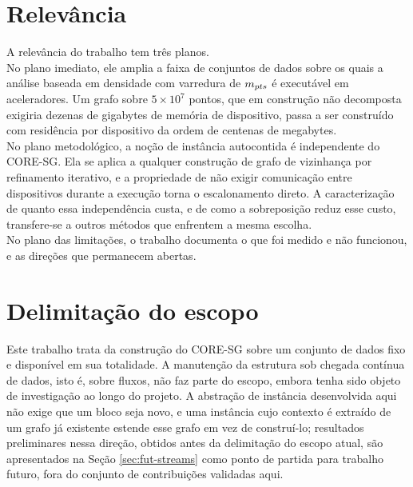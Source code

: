 \section{Relevância\label{sec:significance}}

A relevância do trabalho tem três planos.\\

No plano imediato, ele amplia a faixa de conjuntos de dados sobre os quais a análise baseada em densidade com varredura de $m_{pts}$ é executável em aceleradores. Um grafo sobre $5 \times 10^7$ pontos, que em construção não decomposta exigiria dezenas de gigabytes de memória de dispositivo, passa a ser construído com residência por dispositivo da ordem de centenas de megabytes.\\

No plano metodológico, a noção de instância autocontida é independente do \ac{CORE-SG}. Ela se aplica a qualquer construção de grafo de vizinhança por refinamento iterativo, e a propriedade de não exigir comunicação entre dispositivos durante a execução torna o escalonamento direto. A caracterização de quanto essa independência custa, e de como a sobreposição reduz esse custo, transfere-se a outros métodos que enfrentem a mesma escolha.\\

No plano das limitações, o trabalho documenta o que foi medido e não funcionou, e as direções que permanecem abertas.\\

\section{Delimitação do escopo\label{sec:scope}}

Este trabalho trata da construção do \ac{CORE-SG} sobre um conjunto de dados fixo e disponível em sua totalidade. A manutenção da estrutura sob chegada contínua de dados, isto é, sobre fluxos, não faz parte do escopo, embora tenha sido objeto de investigação ao longo do projeto. A abstração de instância desenvolvida aqui não exige que um bloco seja novo, e uma instância cujo contexto é extraído de um grafo já existente estende esse grafo em vez de construí-lo; resultados preliminares nessa direção, obtidos antes da delimitação do escopo atual, são apresentados na Seção \ref{sec:fut-streams} como ponto de partida para trabalho futuro, fora do conjunto de contribuições validadas aqui.\\

